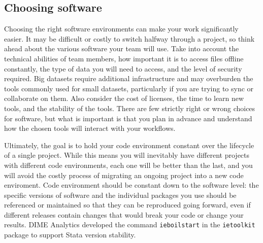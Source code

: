 \subsection{Choosing software}

Choosing the right software environments can make your work significantly easier.
It may be difficult or costly to switch halfway through a project, so
think ahead about the various software your team will use.
Take into account the technical abilities of team members,
how important it is to access files offline constantly, 
the type of data you will need to access, 
and the level of security required.
Big datasets require additional infrastructure and may overburden
the tools commonly used for small datasets,
particularly if you are trying to sync or collaborate on them.
Also consider the cost of licenses, the time to learn new tools,
and the stability of the tools.
There are few strictly right or wrong choices for software,
but what is important is that you plan in advance
and understand how the chosen tools will interact with your workflows.

Ultimately, the goal is to hold your code environment constant 
over the lifecycle of a single project.
While this means you will inevitably have different projects
with different code environments, each one will be better than the last,
and you will avoid the costly process of migrating an ongoing project
into a new code enviroment.
Code environment should be constant down to the software level:
the specific versions of software and the individual packages you use
should be referenced or maintained so that they can be reproduced going forward,
even if different releases contain changes that would break your code
or change your results.
DIME Analytics developed the command \texttt{ieboilstart} in the \texttt{ietoolkit} package
to support Stata version stability.

